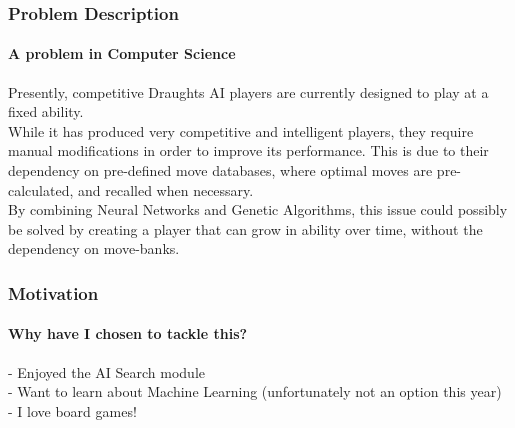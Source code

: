 \documentclass{beamer}
\begin{document}
\begin{frame}
  \frametitle{Problem Description}
  \framesubtitle{A problem in Computer Science}
    Presently, competitive Draughts AI players are currently designed to play at a fixed ability. \\
    While it has produced very competitive and intelligent players, they require manual modifications in order to improve its performance. This is due to their dependency on pre-defined move databases, where optimal moves are pre-calculated, and recalled when necessary. \\
    By combining Neural Networks and Genetic Algorithms, this issue could possibly be solved by creating a player that can grow in ability over time, without the dependency on move-banks.


\end{frame}

\begin{frame}
    \frametitle{Motivation}
    \framesubtitle{Why have I chosen to tackle this?}

    - Enjoyed the AI Search module \\
    - Want to learn about Machine Learning (unfortunately not an option this year) \\
    - I love board games! \\

\end{frame}
\end{document}
